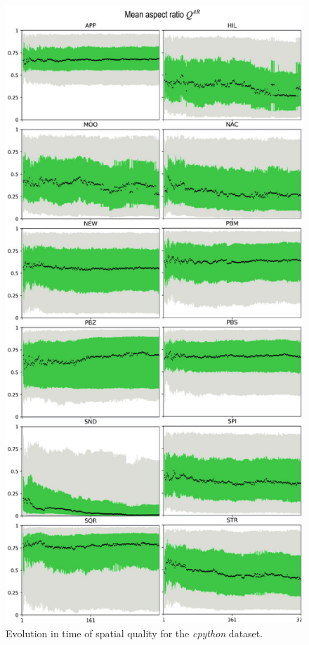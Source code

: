 \begin{figure}[htbp!]
\centering
\includegraphics[width=.8\textwidth]{figures/initial-treemap-evaluation/boxplot-a.png}
\vspace{-0.25cm}
\caption{Evolution in time of spatial quality for the \emph{cpython} dataset.}
\label{fig:boxplots_1a}
\end{figure}

